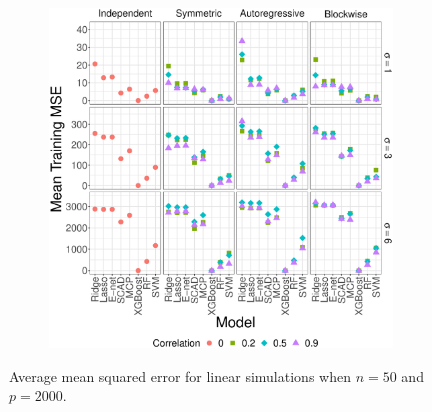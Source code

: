 \documentclass[final,onefignum,onetabnum]{siuro210301}
\begin{document}
\begin{figure}[!htb]
\begin{subfigure}[b]{0.47\textwidth}
			\includegraphics[width=\textwidth]{images/facet/publication_facet_train_mse_nonlinear_50_2000.eps}
			\label{fig:nonlinear-train-mse}
		\end{subfigure}
		\caption{Average mean squared error for linear simulations when $n = 50$ and $p = 2000$.}
		\label{fig:nonlinear-mse}
	\end{figure}
	
\end{document}
